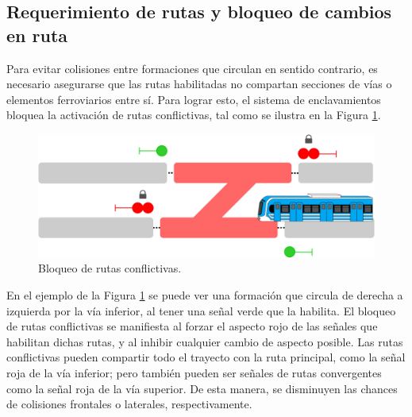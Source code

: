 \subsection{Requerimiento de rutas y bloqueo de cambios en ruta}

	\label{sec:function_2}
	
	Para evitar colisiones entre formaciones que circulan en sentido contrario, es necesario asegurarse que las rutas habilitadas no compartan secciones de vías o elementos ferroviarios entre sí. Para lograr esto, el sistema de enclavamientos bloquea la activación de rutas conflictivas, tal como se ilustra en la Figura \ref{fig:ACG_bloqueo}.

    \begin{figure}[!h]
        \centering
        \includegraphics[width=1\textwidth]{Figuras/bloqueo_rutas}
        \centering\caption{Bloqueo de rutas conflictivas.}
        \label{fig:ACG_bloqueo}
    \end{figure}

	En el ejemplo de la Figura \ref{fig:ACG_bloqueo} se puede ver una formación que circula de derecha a izquierda por la vía inferior, al tener una señal verde que la habilita. El bloqueo de rutas conflictivas se manifiesta al forzar el aspecto rojo de las señales que habilitan dichas rutas, y al inhibir cualquier cambio de aspecto posible. Las rutas conflictivas pueden compartir todo el trayecto con la ruta principal, como la señal roja de la vía inferior; pero también pueden ser señales de rutas convergentes como la señal roja de la vía superior. De esta manera, se disminuyen las chances de colisiones frontales o laterales, respectivamente.
	
	